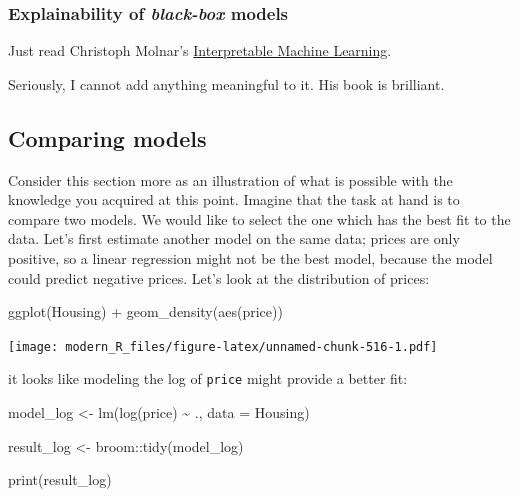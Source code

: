 \documentclass[
]{article}
\newenvironment{Shaded}{\begin{snugshade}}{\end{snugshade}}
\newcommand{\AttributeTok}[1]{\textcolor[rgb]{0.77,0.63,0.00}{#1}}
\newcommand{\FunctionTok}[1]{\textcolor[rgb]{0.00,0.00,0.00}{#1}}
\newcommand{\NormalTok}[1]{#1}
\newcommand{\OtherTok}[1]{\textcolor[rgb]{0.56,0.35,0.01}{#1}}
\newcommand{\SpecialCharTok}[1]{\textcolor[rgb]{0.00,0.00,0.00}{#1}}
\begin{document}
\hypertarget{explainability-of-black-box-models}{%
\subsubsection{\texorpdfstring{Explainability of \emph{black-box} models}{Explainability of black-box models}}\label{explainability-of-black-box-models}}

Just read Christoph Molnar's
\href{https://christophm.github.io/interpretable-ml-book/}{Interpretable Machine Learning}.

Seriously, I cannot add anything meaningful to it. His book is brilliant.

\hypertarget{comparing-models}{%
\subsection{Comparing models}\label{comparing-models}}

Consider this section more as an illustration of what is possible with the knowledge you acquired
at this point. Imagine that the task at hand is to compare two models. We would like to select
the one which has the best fit to the data.
Let's first estimate another model on the same data; prices are only positive, so a linear regression
might not be the best model, because the model could predict negative prices. Let's look at the
distribution of prices:

\begin{Shaded}
\begin{Highlighting}[]
\FunctionTok{ggplot}\NormalTok{(Housing) }\SpecialCharTok{+}
  \FunctionTok{geom\_density}\NormalTok{(}\FunctionTok{aes}\NormalTok{(price))}
\end{Highlighting}
\end{Shaded}

\texttt{[image: modern\_R\_files/figure-latex/unnamed-chunk-516-1.pdf]}

it looks like modeling the log of \texttt{price} might provide a better fit:

\begin{Shaded}
\begin{Highlighting}[]
\NormalTok{model\_log }\OtherTok{\textless{}{-}} \FunctionTok{lm}\NormalTok{(}\FunctionTok{log}\NormalTok{(price) }\SpecialCharTok{\textasciitilde{}}\NormalTok{ ., }\AttributeTok{data =}\NormalTok{ Housing)}

\NormalTok{result\_log }\OtherTok{\textless{}{-}}\NormalTok{ broom}\SpecialCharTok{::}\FunctionTok{tidy}\NormalTok{(model\_log)}

\FunctionTok{print}\NormalTok{(result\_log)}
\end{Highlighting}
\end{Shaded}
\end{document}

